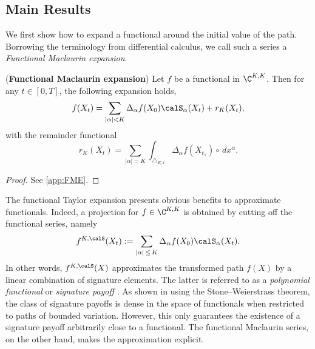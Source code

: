 \subsection{Main Results}

We first show how to expand a functional around the initial value of the path. Borrowing the terminology from differential calculus, we call such a series a  \textit{Functional  Maclaurin expansion}.  

\begin{theorem}\textnormal{(\textbf{Functional  Maclaurin expansion})} \label{thm:FME}
Let $f$ be a functional in $\C^{K,K}$. Then for any $t\in [0,T]$, the following expansion holds,
\begin{align}\label{eq:FSTE}
    f(X_t) = \sum_{|\alpha|< K}  \Delta_{\alpha}f(X_0) \calS_{\alpha}(X_t) + r_{K}(X_t),
\end{align}
with the  remainder functional
\begin{equation}\label{eq:remainder}
    r_{K}(X_t) = \sum_{|\alpha| = K} \int_{\triangle_{K,t}} \Delta_{\alpha}f(X_{t_1}) \circ \, dx^{\alpha}.
\end{equation}
\end{theorem}

\begin{proof}
See \cref{app:FME}.
\end{proof}

The functional Taylor expansion presents obvious benefits to approximate functionals.
 Indeed, a projection for $f \in \C^{K,K}$ is obtained by cutting off the functional series, namely%
\begin{equation*}
     f^{K,\calS}(X_t) := \sum_{|\alpha|\, \le \, K} \Delta_{\alpha}f (X_0) \calS_{\alpha}(X_t).
\end{equation*}
    In other words, $ f^{K,\calS}(X)$ approximates the transformed path $ f(X)$ by a linear combination of signature elements. %
    The latter is referred to  as a \textit{polynomial functional}  \cite{LittererOberhauser} or \textit{signature payoff} \cite{LyonsNum}. %
As shown in \cite{LittererOberhauser} using the Stone–Weierstrass theorem, the class of signature payoffs is dense in the space of functionals  when restricted to paths of bounded variation.  
However, this only guarantees the existence of a signature payoff arbitrarily close to a functional. The functional Maclaurin  series, on the other hand, makes the approximation explicit.

